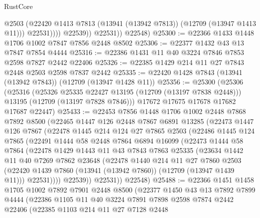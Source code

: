 \begin{lexlean}{RustCore}
\begin{coremodule}
                      @2503
                      (@22420 @1413 @7813 (@13941 (@13942 @7813)) (@12709 (@13947 @1413 @11)))
                      @22531))))
              @22539))
          @22531))
      @22548)
@25300 := @22366 @1433 @1448 @1706 @1002 @7847 @7856 @2448 @8502
@25306 := @22377 @1432 @43 @13 @7847 @7854 @4444
@25316 := @22386 @1431 @11 @40 @3224 @7846 @7853 @2598 @7827 @2442 @22406
@25326 := @22385 @1429 @214 @11 @27 @7843 @2448 @2503 @2598 @7837 @2442
@25335 := @22420 @1428 @7843 (@13941 (@13942 @7843)) (@12709 (@13947 @1428 @11))
@25356 := @25300
    (@25306
      (@25316
        (@25326 @25335 @22427 @13195 (@12709 (@13197 @7838 @2448)))
        @13195
        (@12709 (@13197 @7828 @7846)))
      @17672
      @17675
      @17678
      @17682
      @17687
      @22447)
@25433 := @22453
    @7856
    @1448
    @1706
    @1002
    @2448
    @7868
    @7892
    @8500
    (@22465
      @1447
      @126
      @2448
      @7867
      @6891
      @13285
      (@22473
        @1447
        @126
        @7867
        (@22478
          @1445
          @214
          @124
          @27
          @7865
          @2503
          (@22486
            @1445
            @124
            @7865
            (@22491
              @1444
              @58
              @2448
              @7864
              @6894
              @16099
              (@22473
                @1444
                @58
                @7864
                (@22478
                  @1429
                  @1443
                  @11
                  @43
                  @7843
                  @7863
                  @25335
                  (@23634
                    @1442
                    @11
                    @40
                    @7269
                    @7862
                    @23648
                    (@22478
                      @1440
                      @214
                      @11
                      @27
                      @7860
                      @2503
                      (@22420 @1439 @7860 (@13941 (@13942 @7860)) (@12709 (@13947 @1439 @11)))
                      @22531))))
              @22539))
          @22531))
      @22548)
@25488 := @22366
    @1451
    @1458
    @1705
    @1002
    @7892
    @7901
    @2448
    @8500
    (@22377
      @1450
      @43
      @13
      @7892
      @7899
      @4444
      (@22386
        @1105
        @11
        @40
        @3224
        @7891
        @7898
        @2598
        @7874
        @2442
        @22406
        (@22385
          @1103
          @214
          @11
          @27
          @7128
          @2448

\end{coremodule}
\end{lexlean}
